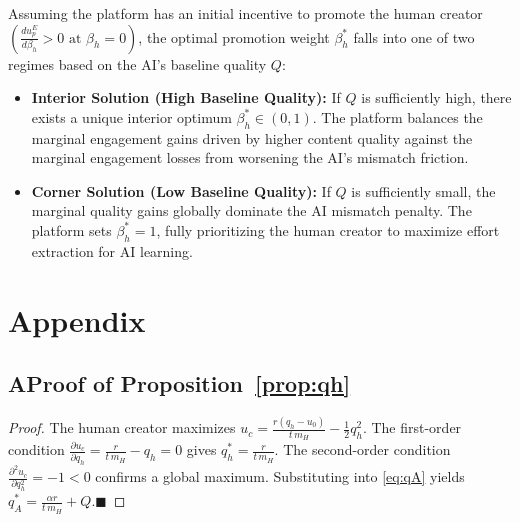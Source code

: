 \documentclass[mnsc,nonblindrev]{informs3_NoOR}
\begin{document}
\begin{proposition}
\label{prop:beta(eng)}
Assuming the platform has an initial incentive to promote the human creator $\left( \frac{du_{p}^{E}}{d\beta_{h}} > 0 \text{ at } \beta_{h}=0 \right)$, the optimal promotion weight $\beta_{h}^{*}$ falls into one of two regimes based on the AI's baseline quality $Q$:
\begin{itemize}
    \item[(i)] \textbf{Interior Solution (High Baseline Quality):} If $Q$ is sufficiently high, there exists a unique interior optimum $\beta_{h}^{*} \in (0, 1)$. The platform balances the marginal engagement gains driven by higher content quality against the marginal engagement losses from worsening the AI's mismatch friction.
    \item[(ii)] \textbf{Corner Solution (Low Baseline Quality):} If $Q$ is sufficiently small, the marginal quality gains globally dominate the AI mismatch penalty. The platform sets $\beta_{h}^{*} = 1$, fully prioritizing the human creator to maximize effort extraction for AI learning.
\end{itemize}
\end{proposition}





\appendix
\section*{Appendix}

\subsection*{A\quad Proof of Proposition~\ref{prop:qh}}
\label{app:proof_qh}
\begin{proof}
The human creator maximizes $u_c = \tfrac{r(q_h - u_0)}{t\,m_H} - \tfrac{1}{2}q_h^2$. The first-order condition $\tfrac{\partial u_c}{\partial q_h} = \tfrac{r}{t\,m_H} - q_h = 0$ gives $q_h^* = \tfrac{r}{t\,m_H}$. The second-order condition $\tfrac{\partial^2 u_c}{\partial q_h^2} = -1 < 0$ confirms a global maximum. Substituting into \eqref{eq:qA} yields $q_A^* = \tfrac{\alpha r}{t\,m_H} + Q$.\hfill$\blacksquare$
\end{proof}
\end{document}
